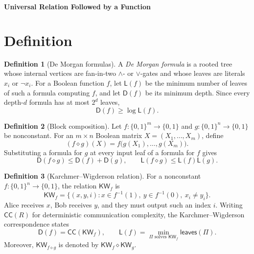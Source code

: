 \documentclass[10pt,a4paper]{article}
\theoremstyle{definition}
\newtheorem{definition}{Definition}
\theoremstyle{plain}
\theoremstyle{definition}
\newcommand{\KW}{\mathsf{KW}}
\newcommand{\CC}{\mathsf{CC}}
\newcommand{\Depth}{\mathsf{D}}
\newcommand{\Size}{\mathsf{L}}
\newcommand{\Leaves}{\mathsf{leaves}}
\begin{document}
\begin{center}
  {\Large\bfseries Universal Relation Followed by a Function}
\end{center}
\section{Definition}
\begin{definition}[De Morgan formulas]
A \emph{De Morgan formula} is a rooted tree whose internal vertices are fan-in-two
$\wedge$- or $\vee$-gates and whose leaves are literals $x_i$ or $\neg x_i$.
For a Boolean function $f$, let $\Size(f)$ be the minimum number of leaves of such a
formula computing $f$, and let $\Depth(f)$ be its minimum depth. Since every depth-$d$
formula has at most $2^d$ leaves,
\begin{equation}\label{eq:size-depth}
  \Depth(f)\geq \log \Size(f).
\end{equation}
\end{definition}

\begin{definition}[Block composition]
Let $f:\{0,1\}^{m}\to\{0,1\}$ and $g:\{0,1\}^{n}\to\{0,1\}$ be nonconstant.
For an $m\times n$ Boolean matrix $X=(X_1,\ldots,X_m)$, define
\begin{equation}\label{eq:composition}
  (f\diamond g)(X)=f\bigl(g(X_1),\ldots,g(X_m)\bigr).
\end{equation}
Substituting a formula for $g$ at every input leaf of a formula for $f$ gives
\begin{equation}\label{eq:easy-upper}
  \Depth(f\diamond g)\leq \Depth(f)+\Depth(g),
  \qquad
  \Size(f\diamond g)\leq \Size(f)\Size(g).
\end{equation}
\end{definition}

\begin{definition}[Karchmer--Wigderson relation]
For a nonconstant $f:\{0,1\}^{n}\to\{0,1\}$, the relation $\KW_f$ is
\begin{equation}\label{eq:kw-relation}
  \KW_f=\{(x,y,i):x\in f^{-1}(1),\ y\in f^{-1}(0),\ x_i\neq y_i\}.
\end{equation}
Alice receives $x$, Bob receives $y$, and they must output such an index $i$.
Writing $\CC(R)$ for deterministic communication complexity, the
Karchmer--Wigderson correspondence states
\begin{equation}\label{eq:kw-correspondence}
  \Depth(f)=\CC(\KW_f),
  \qquad
  \Size(f)=\min_{\Pi\text{ solves }\KW_f}\Leaves(\Pi).
\end{equation}
Moreover, $\KW_{f\diamond g}$ is denoted by $\KW_f\diamond\KW_g$.
\end{definition}
\end{document}
